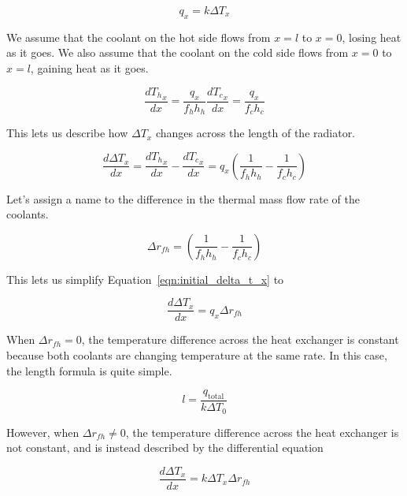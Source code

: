 \documentclass{article}
\numberwithin{equation}{subsection}
\theoremstyle{remark}
\newcommand{\qtotal}{q_{\mathrm{total}}}
\newcommand{\DeltaT}{\Delta{}T}
\newcommand{\Deltarfh}{\Delta{}r_{fh}}
\begin{document}
\begin{equation}
q_{x} = k \DeltaT_{x}
\end{equation}

We assume that the coolant on the hot side flows from \(x = l\) to \(x = 0\), losing heat as it goes.
We also assume that the coolant on the cold side flows from \(x = 0\) to \(x = l\), gaining heat as it goes.

\begin{equation}
\frac{d{T_{h}}_{x}}{dx} = \frac{q_{x}}{f_{h} h_{h}}
\frac{d{T_{c}}_{x}}{dx} = \frac{q_{x}}{f_{c} h_{c}}
\end{equation}

This lets us describe how \(\DeltaT_{x}\) changes across the length of the radiator.

\begin{equation}
\label{eqn:initial_delta_t_x}
\frac{d\DeltaT_{x}}{dx} = \frac{d{T_{h}}_{x}}{dx} - \frac{d{T_{c}}_{x}}{dx} = q_{x} \left(\frac{1}{f_{h} h_{h}} - \frac{1}{f_{c} h_{c}}\right)
\end{equation}

Let's assign a name to the difference in the thermal mass flow rate of the coolants.

\begin{equation}
\Deltarfh = \left(\frac{1}{f_{h} h_{h}} - \frac{1}{f_{c} h_{c}}\right)
\end{equation}

This lets us simplify Equation~\ref{eqn:initial_delta_t_x} to

\begin{equation}
\frac{d\DeltaT_{x}}{dx} = q_{x} \Deltarfh
\end{equation}

When \(\Deltarfh = 0\), the temperature difference across the heat exchanger is constant because both coolants are changing temperature at the same rate.
In this case, the length formula is quite simple.

\begin{equation}
l = \frac{\qtotal}{k \DeltaT_{0}}
\end{equation}

However, when \(\Deltarfh \ne 0\), the temperature difference across the heat exchanger is not constant, and is instead described by the differential equation

\begin{equation}
\frac{d\DeltaT_{x}}{dx} = k \DeltaT_{x} \Deltarfh
\end{equation}
\end{document}
